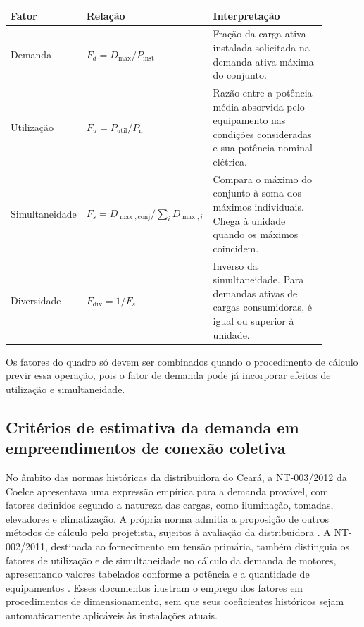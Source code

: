 \begin{quadro}[!htbp]
\centering
\caption{Fatores empregados na estimativa de demanda}\label{qua:fatores-demanda}
{\small\renewcommand{\arraystretch}{1.35}
\begin{tabular}{|p{0.22\linewidth}|p{0.24\linewidth}|p{0.43\linewidth}|}\hline
\textbf{Fator} & \textbf{Relação} & \textbf{Interpretação} \\\hline
Demanda & $F_d=D_{\max}/P_{\mathrm{inst}}$ & Fração da carga ativa instalada solicitada na demanda ativa máxima do conjunto. \\\hline
Utilização & $F_u=P_{\mathrm{util}}/P_{\mathrm n}$ & Razão entre a potência média absorvida pelo equipamento nas condições consideradas e sua potência nominal elétrica. \\\hline
Simultaneidade & $F_s=D_{\max,\mathrm{conj}}/\sum_i D_{\max,i}$ & Compara o máximo do conjunto à soma dos máximos individuais. Chega à unidade quando os máximos coincidem. \\\hline
Diversidade & $F_{\mathrm{div}}=1/F_s$ & Inverso da simultaneidade. Para demandas ativas de cargas consumidoras, é igual ou superior à unidade. \\\hline
\end{tabular}}
\end{quadro}

Os fatores do quadro só devem ser combinados quando o procedimento de cálculo previr essa operação, pois o fator de demanda pode já incorporar efeitos de utilização e simultaneidade.

\subsection{Critérios de estimativa da demanda em empreendimentos de conexão coletiva}

No âmbito das normas históricas da distribuidora do Ceará, a NT-003/2012 da Coelce apresentava uma expressão empírica para a demanda provável, com fatores definidos segundo a natureza das cargas, como iluminação, tomadas, elevadores e climatização. A própria norma admitia a proposição de outros métodos de cálculo pelo projetista, sujeitos à avaliação da distribuidora \cite[itens~14.1 e~14.3]{coelce0032012}. A NT-002/2011, destinada ao fornecimento em tensão primária, também distinguia os fatores de utilização e de simultaneidade no cálculo da demanda de motores, apresentando valores tabelados conforme a potência e a quantidade de equipamentos \cite[tabelas~9 e~10]{coelce0022011}. Esses documentos ilustram o emprego dos fatores em procedimentos de dimensionamento, sem que seus coeficientes históricos sejam automaticamente aplicáveis às instalações atuais.


